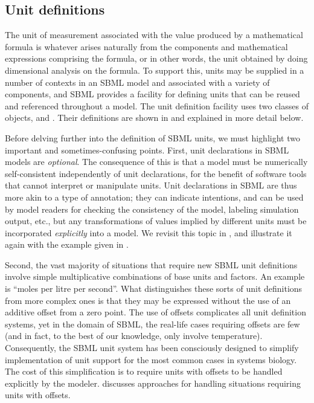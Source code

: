 \subsection{Unit definitions}
\label{sec:unitdefinitions}

The unit of measurement associated with the value produced by a
mathematical formula is whatever arises naturally from the
components and mathematical expressions comprising the formula, or
in other words, the unit obtained by doing dimensional analysis on
the formula.  To support this, units may be supplied in a number
of contexts in an SBML model and associated with a variety of
components, and SBML provides a facility for defining units that
can be reused and referenced throughout a model.  The unit
definition facility uses two classes of objects, \UnitDefinition
and \Unit.  Their definitions are shown in
 and explained in more detail
below.

Before delving further into the definition of SBML units, we must
highlight two important and sometimes-confusing points.  First,
unit declarations in SBML models are \emph{optional}.  The
consequence of this is that a model must be numerically
self-consistent independently of unit declarations, for the
benefit of software tools that cannot interpret or manipulate
units.  Unit declarations in SBML are thus more akin to a type of
annotation; they can indicate intentions, and can be used by model
readers for checking the consistency of the model, labeling
simulation output, etc., but any transformations of values implied
by different units must be incorporated \emph{explicitly} into a
model.  We revisit this topic in ,
and illustrate it again with the example given in
.

Second, the vast majority of situations that require new SBML unit
definitions involve simple multiplicative combinations of base
units and factors.  An example is ``moles per litre per second''.
What distinguishes these sorts of unit definitions from more
complex ones is that they may be expressed without the use of an
additive offset from a zero point.  The use of offsets complicates
all unit definition systems, yet in the domain of SBML, the
real-life cases requiring offsets are few (and in fact, to the
best of our knowledge, only involve temperature).  Consequently,
the SBML unit system has been consciously designed to simplify
implementation of unit support for the most common cases in
systems biology.  The cost of this simplification is to require
units with offsets to be handled explicitly by the modeler.
 discusses approaches
for handling situations requiring units with offsets.


